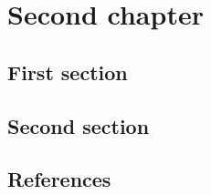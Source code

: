 \chapter{Second chapter}

\section{First section}\lipsum
\section{Second section}\cite{2021MNRASDavidClerisDustywave}\lipsum

\section*{References}

